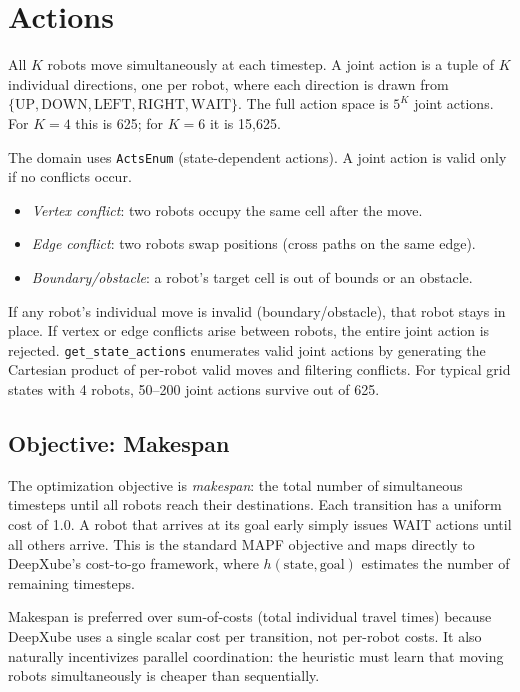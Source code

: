 \documentclass[11pt]{article}
\begin{document}
\section{Actions}

All $K$ robots move simultaneously at each timestep. A joint action is a tuple of $K$ individual directions, one per robot, where each direction is drawn from $\{\text{UP}, \text{DOWN}, \text{LEFT}, \text{RIGHT}, \text{WAIT}\}$. The full action space is $5^K$ joint actions. For $K = 4$ this is 625; for $K = 6$ it is 15{,}625.

The domain uses \texttt{ActsEnum} (state-dependent actions). A joint action is valid only if no conflicts occur.

\begin{itemize}[nosep]
    \item \textit{Vertex conflict}: two robots occupy the same cell after the move.
    \item \textit{Edge conflict}: two robots swap positions (cross paths on the same edge).
    \item \textit{Boundary/obstacle}: a robot's target cell is out of bounds or an obstacle.
\end{itemize}

If any robot's individual move is invalid (boundary/obstacle), that robot stays in place. If vertex or edge conflicts arise between robots, the entire joint action is rejected. \texttt{get\_state\_actions} enumerates valid joint actions by generating the Cartesian product of per-robot valid moves and filtering conflicts. For typical grid states with 4 robots, 50--200 joint actions survive out of 625.

\subsection{Objective: Makespan}

The optimization objective is \textit{makespan}: the total number of simultaneous timesteps until all robots reach their destinations. Each transition has a uniform cost of 1.0. A robot that arrives at its goal early simply issues WAIT actions until all others arrive. This is the standard MAPF objective and maps directly to DeepXube's cost-to-go framework, where $h(\text{state}, \text{goal})$ estimates the number of remaining timesteps.

Makespan is preferred over sum-of-costs (total individual travel times) because DeepXube uses a single scalar cost per transition, not per-robot costs. It also naturally incentivizes parallel coordination: the heuristic must learn that moving robots simultaneously is cheaper than sequentially.
\end{document}
